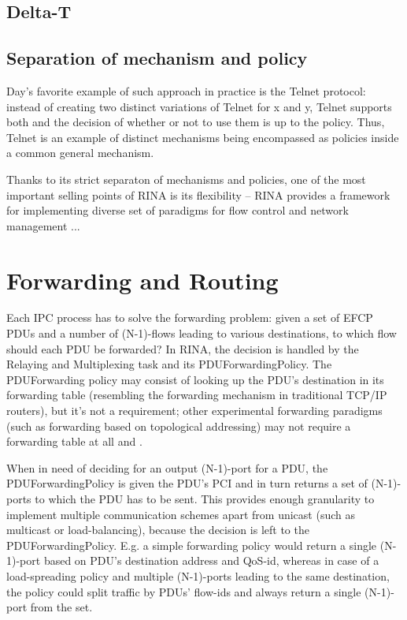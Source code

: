         \subsection{Delta-T}



        \subsection{Separation of mechanism and policy}

            Day's favorite example of such approach in practice is the Telnet protocol: instead of creating two distinct variations of Telnet for x and y, Telnet supports both and the decision of whether or not to use them is up to the policy. Thus, Telnet is an example of distinct mechanisms being encompassed as policies inside a common general mechanism.

            Thanks to its strict separaton of mechanisms and policies, one of the most important selling points of RINA is its flexibility -- RINA provides a framework for implementing diverse set of paradigms for flow control and network management  ...

    \section{Forwarding and Routing}
        Each IPC process has to solve the forwarding problem: given a set of EFCP PDUs and a number of (N-1)-flows leading to various destinations, to which flow should each PDU be forwarded? In RINA, the decision is handled by the Relaying and Multiplexing task and its PDUForwardingPolicy. The PDUForwarding policy may consist of looking up the PDU's destination in its forwarding table (resembling the forwarding mechanism in traditional TCP/IP routers), but it's not a requirement; other experimental forwarding paradigms (such as forwarding based on topological addressing) may not require a forwarding table at all and .

        When in need of deciding for an output (N-1)-port for a PDU, the PDUForwardingPolicy is given the PDU's PCI and in turn returns a set of (N-1)-ports to which the PDU has to be sent. This provides enough granularity to implement multiple communication schemes apart from unicast (such as multicast or load-balancing), because the decision is left to the PDUForwardingPolicy. E.g. a simple forwarding policy would return a single (N-1)-port based on PDU's destination address and QoS-id, whereas in case of a load-spreading policy and multiple (N-1)-ports leading to the same destination, the policy could split traffic by PDUs' flow-ids and always return a single (N-1)-port from the set.

